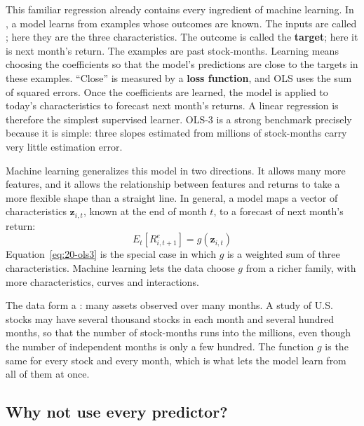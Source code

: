 This familiar regression already contains every ingredient of machine learning. In , a model learns from examples whose outcomes are known. The inputs are called ; here they are the three characteristics. The outcome is called the \textbf{target}; here it is next month's return. The examples are past stock-months. Learning means choosing the coefficients so that the model's predictions are close to the targets in these examples. ``Close'' is measured by a \textbf{loss function}, and OLS uses the sum of squared errors. Once the coefficients are learned, the model is applied to today's characteristics to forecast next month's returns. A linear regression is therefore the simplest supervised learner. OLS-3 is a strong benchmark precisely because it is simple: three slopes estimated from millions of stock-months carry very little estimation error.

Machine learning generalizes this model in two directions. It allows many more features, and it allows the relationship between features and returns to take a more flexible shape than a straight line. In general, a model maps a vector of characteristics $\mathbf{z}_{i,t}$, known at the end of month $t$, to a forecast of next month's return:
\begin{equation}
  E_t[R^{e}_{i,t+1}] = g(\mathbf{z}_{i,t})
  \label{eq:20-g}
\end{equation}
Equation~\eqref{eq:20-ols3} is the special case in which $g$ is a weighted sum of three characteristics. Machine learning lets the data choose $g$ from a richer family, with more characteristics, curves and interactions.

The data form a : many assets observed over many months. A study of U.S. stocks may have several thousand stocks in each month and several hundred months, so that the number of stock-months runs into the millions, even though the number of independent months is only a few hundred. The function $g$ is the same for every stock and every month, which is what lets the model learn from all of them at once.

\subsection{Why not use every predictor?}
\label{sec:20-why}


